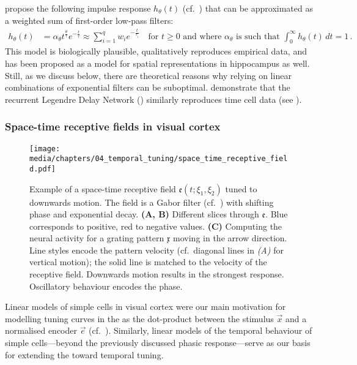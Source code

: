 \citet{howard2014unified} propose the following impulse response $h_\theta(t)$ (cf.~) that can be approximated as a weighted sum of first-order low-pass filters:
\begin{align*}
	h_\theta(t)
	&=
		\alpha_\theta t^{\frac{\theta}{\tau}} e^{-\frac{t}{\tau}}
	\approx
		\sum_{i = 1}^q w_i e^{-\frac{t}{\tau_i}}
	\quad \text{for } t \geq 0 \text{ and where } \alpha_\theta \text{ is such that } \int_{0}^\infty h_\theta(t) \,dt = 1 \,.
\end{align*}
This model is biologically plausible, qualitatively reproduces empirical data, and has been proposed as a model for spatial representations in hippocampus as well.
Still, as we discuss below, there are theoretical reasons why relying on linear combinations of exponential filters can be suboptimal.
 demonstrate that the recurrent Legendre Delay Network (\LDN) similarly reproduces time cell data (see ).

\subsubsection{Space-time receptive fields in visual cortex}

\begin{figure}
	\centering
	\texttt{[image: media/chapters/04\_temporal\_tuning/space\_time\_receptive\_field.pdf]}%
	{\label{fig:space_time_receptive_field_a}}%
	{\label{fig:space_time_receptive_field_b}}%
	{\label{fig:space_time_receptive_field_c}}%
	\caption[Example of a space-time receptive field tuned to downwards motion]{Example of a space-time receptive field $\mathfrak{e}(t; \xi_1, \xi_2)$ tuned to downwards motion. The field is a Gabor filter (cf.~) with shifting phase and exponential decay.
	\textbf{(A, B)} Different slices through $\mathfrak{e}$.
	Blue corresponds to positive, red to negative values.
	\textbf{(C)} Computing the neural activity for a grating pattern $\mathfrak{x}$ moving in the arrow direction.
	Line styles encode the pattern velocity (cf.~diagonal lines in \emph{(A)} for vertical motion); the solid line is matched to the velocity of the receptive field.
	Downwards motion results in the strongest response.
	Oscillatory behaviour encodes the phase.
	}
	\label{fig:space_time_receptive_field}
\end{figure}

Linear models of simple cells in visual cortex were our main motivation for modelling tuning curves in the \NEF as the dot-product between the stimulus $\vec x$ and a normalised encoder $\vec e$ (cf.~).
Similarly, linear models of the temporal behaviour of simple cells---beyond the previously discussed phasic response---serve as our basis for extending the \NEF toward temporal tuning.

